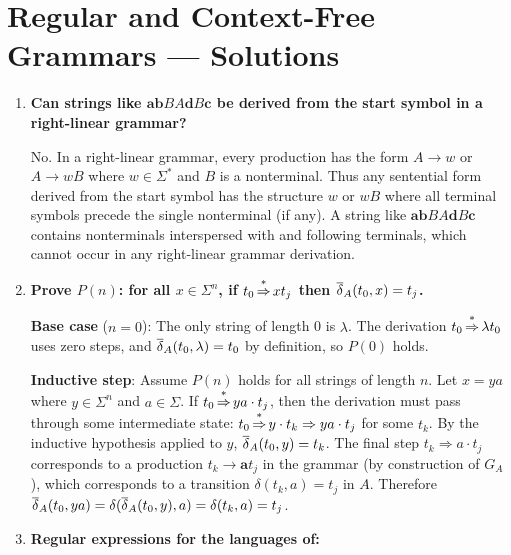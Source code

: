 
\chapter{Regular and Context-Free Grammars --- Solutions}

\begin{enumerate}[{8.}1. ]

\item \textbf{Can strings like $\pmb{ab}BA\pmb{d}B\pmb{c}$ be derived from the start symbol in a right-linear grammar?}

No. In a right-linear grammar, every production has the form $A \to w$ or $A \to wB$ where $w \in \Sigma^*$ and $B$ is a nonterminal. Thus any sentential form derived from the start symbol has the structure $w$ or $wB$ where all terminal symbols precede the single nonterminal (if any). A string like $\pmb{ab}BA\pmb{d}B\pmb{c}$ contains nonterminals interspersed with and following terminals, which cannot occur in any right-linear grammar derivation.

\item \textbf{Prove $P(n)$: for all $x \in \Sigma^n$, if $t_0 \operatorname{\overset{*}{\Rightarrow}} xt_j$ then $\overline{\delta}_A(t_0, x) = t_j$.}

\textbf{Base case} ($n=0$): The only string of length 0 is $\lambda$. The derivation $t_0 \operatorname{\overset{*}{\Rightarrow}} \lambda t_0$ uses zero steps, and $\overline{\delta}_A(t_0, \lambda) = t_0$ by definition, so $P(0)$ holds.

\textbf{Inductive step}: Assume $P(n)$ holds for all strings of length $n$. Let $x = ya$ where $y \in \Sigma^n$ and $a \in \Sigma$. If $t_0 \operatorname{\overset{*}{\Rightarrow}} ya \cdot t_j$, then the derivation must pass through some intermediate state: $t_0 \operatorname{\overset{*}{\Rightarrow}} y \cdot t_k \Rightarrow ya \cdot t_j$ for some $t_k$. By the inductive hypothesis applied to $y$, $\overline{\delta}_A(t_0, y) = t_k$. The final step $t_k \Rightarrow a \cdot t_j$ corresponds to a production $t_k \to \pmb{a} t_j$ in the grammar (by construction of $G_A$), which corresponds to a transition $\delta(t_k, a) = t_j$ in $A$. Therefore $\overline{\delta}_A(t_0, ya) = \delta(\overline{\delta}_A(t_0, y), a) = \delta(t_k, a) = t_j$.

\item \textbf{Regular expressions for the languages of:}


\end{enumerate}
